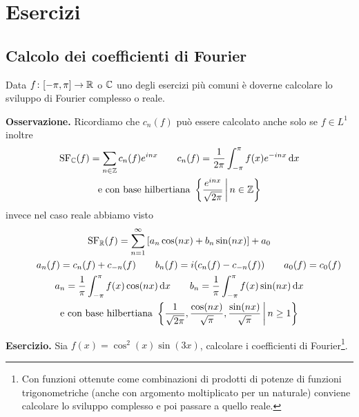 %
%

\section{Esercizi}

\subsection{Calcolo dei coefficienti di Fourier}

Data $f \colon [-\pi, \pi] \to \mathbb R$ o $\mathbb C$ uno degli esercizi più comuni è doverne calcolare lo sviluppo di Fourier complesso o reale.

\textbf{Osservazione.}
Ricordiamo che $c_n(f)$ può essere calcolato anche solo se $f \in L^1$ inoltre
$$
\begin{gathered}
	\operatorname{SF}_\mathbb C(f) = \sum_{n \in \mathbb Z} c_n(f) e^{inx}
	\qquad
	c_n(f) = \frac{1}{2\pi} \int_{-\pi}^\pi f(x) e^{-inx} \,\mathrm{d} x \\
	\text{e con base hilbertiana } \left\{ \frac{e^{inx}}{\sqrt{2\pi}} \,\middle|\, n \in \mathbb Z \right\}
\end{gathered}
$$
invece nel caso reale abbiamo visto
$$
\begin{gathered}
	\operatorname{SF}_\mathbb R(f) = \sum_{n=1}^\infty \left[ a_n \cos(nx) + b_n \sin(nx) \right] + a_0 \\
	\qquad
	a_n(f) = c_n(f) + c_{-n}(f)
	\qquad
	b_n(f) = i(c_n(f) - c_{-n}(f))
	\qquad
	a_0(f) = c_0(f) \\
	a_n = \frac{1}{\pi} \int_{-\pi}^\pi f(x) \cos(nx) \,\mathrm{d} x
	\qquad
	b_n = \frac{1}{\pi} \int_{-\pi}^\pi f(x) \sin(nx) \,\mathrm{d} x \\
	\text{e con base hilbertiana } \left\{ \frac{1}{\sqrt{2\pi}}, \frac{\cos(nx)}{\sqrt{\pi}}, \frac{\sin(nx)}{\sqrt{\pi}} \,\middle|\, n \geq 1 \right\}
\end{gathered}
$$

\textbf{Esercizio.}
Sia $f(x) = \cos^2(x) \sin(3x)$, calcolare i coefficienti di Fourier\footnote{Con funzioni ottenute come combinazioni di prodotti di potenze di funzioni trigonometriche (anche con argomento moltiplicato per un naturale) conviene calcolare lo sviluppo complesso e poi passare a quello reale.}.

